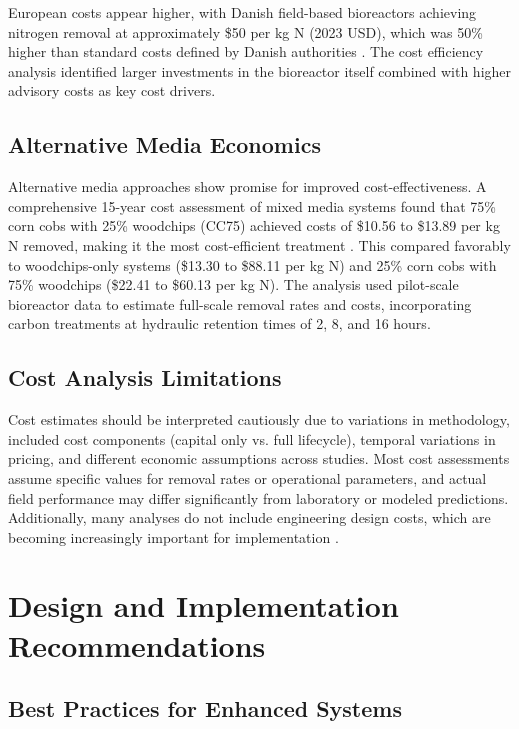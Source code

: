 \documentclass[12pt,a4paper]{article}
\begin{document}
European costs appear higher, with Danish field-based bioreactors achieving nitrogen removal at approximately \$50 per kg N (2023 USD), which was 50\% higher than standard costs defined by Danish authorities \citep{RN312}. The cost efficiency analysis identified larger investments in the bioreactor itself combined with higher advisory costs as key cost drivers.

\subsection{Alternative Media Economics}

Alternative media approaches show promise for improved cost-effectiveness. A comprehensive 15-year cost assessment of mixed media systems found that 75\% corn cobs with 25\% woodchips (CC75) achieved costs of \$10.56 to \$13.89 per kg N removed, making it the most cost-efficient treatment \citep{new_ref_4}. This compared favorably to woodchips-only systems (\$13.30 to \$88.11 per kg N) and 25\% corn cobs with 75\% woodchips (\$22.41 to \$60.13 per kg N). The analysis used pilot-scale bioreactor data to estimate full-scale removal rates and costs, incorporating carbon treatments at hydraulic retention times of 2, 8, and 16 hours.

\subsection{Cost Analysis Limitations}

Cost estimates should be interpreted cautiously due to variations in methodology, included cost components (capital only vs. full lifecycle), temporal variations in pricing, and different economic assumptions across studies. Most cost assessments assume specific values for removal rates or operational parameters, and actual field performance may differ significantly from laboratory or modeled predictions. Additionally, many analyses do not include engineering design costs, which are becoming increasingly important for implementation \citep{RN312}.

\section{Design and Implementation Recommendations}

\subsection{Best Practices for Enhanced Systems}
\end{document}
